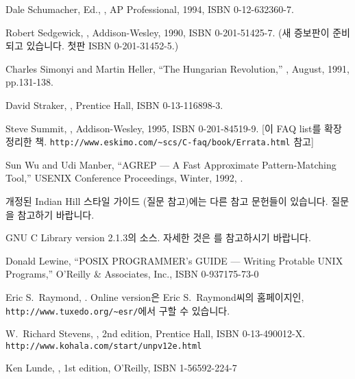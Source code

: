 \begin{thebibliography}{99}
	Dale Schumacher, Ed., 
	, AP Professional, 1994,
	ISBN 0-12-632360-7.

	Robert Sedgewick, , Addison-Wesley, 1990,
	ISBN 0-201-51425-7.   (새 증보판이 준비되고 있습니다.
	첫판 ISBN 0-201-31452-5.)

	Charles Simonyi and Martin Heller, ``The Hungarian Revolution,''
	, August, 1991, pp.131-138.

	David Straker, , Prentice Hall,
	ISBN 0-13-116898-3.

	Steve Summit, 
	, 
	Addison-Wesley, 
	1995, ISBN 0-201-84519-9.   [이 FAQ list를 확장 정리한 책.
	\verb+http://www.eskimo.com/~scs/C-faq/book/Errata.html+ 참고]

	Sun Wu and Udi Manber, ``AGREP --- A Fast Approximate Pattern-Matching
	Tool,'' USENIX Conference Proceedings, Winter, 1992, 
	.

	개정된 Indian Hill 스타일 가이드 (질문  참고)에는 다른 참고
	문헌들이 있습니다.  질문 을 참고하기 바랍니다.

	GNU C Library version 2.1.3의 소스.
	자세한 것은 를 
	참고하시기 바랍니다.

	Donald Lewine, 
	``POSIX PROGRAMMER's GUIDE --- Writing Protable UNIX Programs,''
	O'Reilly \& Associates, Inc., ISBN 0-937175-73-0

	Eric S.\ Raymond, .
	Online version은 Eric S.\ Raymond씨의 홈페이지인, 
	\verb+http://www.tuxedo.org/~esr/+에서
	구할 수 있습니다.

        W.\ Richard Stevens, , 2nd edition, Prentice Hall,
        ISBN 0-13-490012-X. \\
        \verb+http://www.kohala.com/start/unpv12e.html+

	Ken Lunde, , 1st edition,
	O'Reilly, ISBN 1-56592-224-7

\end{thebibliography}

%
%
